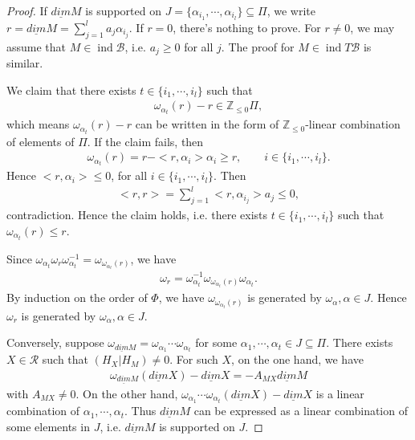 \documentclass[12pt]{amsart}
\begin{document}
\begin{proof}
    If $\underline{dim}M $ is supported on $J= \{ \alpha_{i_1}, \cdots, \alpha_{i_l} \}\subseteq \Pi$,
    we write  $r = \underline{dim}M  = \sum\limits_{j=1}^l a_j\alpha_{i_j}$. 
    If $r=0$, there's nothing to prove. For $r \neq 0$,
    we may assume that  $M \in \operatorname{ind}\mathcal{B}$, i.e. $a_j \geq 0$ for all $ j$.
    The proof for $M \in \operatorname{ind}T\mathcal{B}$ is similar.

    We claim that there exists $t\in \{ i_1,\cdots, i_l \}$ such that 
    \begin{align*}
        \omega_{\alpha_t}(r)-r \in \mathbb{Z}_{\leq 0}\Pi,
    \end{align*}
    which means $ \omega_{\alpha_t}(r)-r $ can be written in the form of $\mathbb{Z}_{\leq 0}$-linear combination of elements of $\Pi$.
    If the claim fails, then 
    \begin{align*}
        \omega_{\alpha_t}(r) = r-<r,\alpha_i>\alpha_i \geq r, \qquad  i\in \{ i_1,\cdots,i_l \}.
    \end{align*}
    Hence $<r,\alpha_i> \leq 0$, for all $i\in \{ i_1,\cdots,i_l \}$.
    Then 
    \begin{align*}
        <r,r> = \sum\limits_{j=1}^l <r,\alpha_{i_j}>a_j \leq 0,
    \end{align*}
    contradiction. 
    Hence the claim holds, i.e. there exists $t\in \{ i_1,\cdots, i_l \}$ such that $\omega_{\alpha_t}(r)\leq r$.
    
    Since $\omega_{\alpha_t} \omega_r \omega_{\alpha_t}^{-1} = \omega_{\omega_{\alpha_t}(r)}$, we have 
    \begin{align*}
        \omega_r = \omega_{\alpha_t}^{-1} \omega_{\omega_{\alpha_t}(r)} \omega_{\alpha_t} .
    \end{align*}
    By induction on the order of $\Phi$, we have $ \omega_{\omega_{\alpha_t}(r)} $ is generated by  $\omega_{\alpha},\alpha \in J$.
    Hence $\omega_r$ is generated by  $\omega_{\alpha},\alpha \in J$.

    Conversely, suppose $\omega_{\underline{dim}M}=\omega_{\alpha_1}\cdots \omega_{\alpha_t}$ for some $\alpha_1,\cdots,\alpha_t \in J\subseteq \Pi$.
    There exists $X\in \mathcal{R}$ such that $(H_X|H_M)\neq 0$.
    For such $X$, on the one hand, we have 
    \begin{align*}
        \omega_{\underline{dim}M}(\underline{dim}X) - \underline{dim}X = -A_{MX} \underline{dim}M 
    \end{align*}
    with $A_{MX}\neq 0$.
    On the other hand,
        $\omega_{\alpha_1}\cdots \omega_{\alpha_t}(\underline{dim}X)-\underline{dim}X$
    is a linear combination of $\alpha_1,\cdots,\alpha_t$.
    Thus $\underline{dim}M$ can be expressed as a linear combination of some elements in $J$, i.e. $\underline{dim}M$ is supported on $J$. 
\end{proof}
\end{document}
